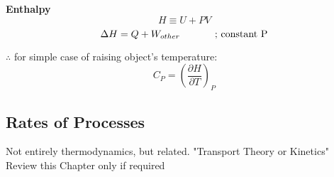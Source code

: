 \begin{shaded}
\textbf{Enthalpy}
\[H \equiv U + PV\]
\begin{equation}
    \Delta H = Q + W_{other} \text{ \hspace{10mm} ; constant P}
\end{equation}
\end{shaded}

$\therefore$ for simple case of raising object's temperature:
\[C_P = \left(\frac{\partial H}{\partial T}\right)_P \]

\subsection{Rates of Processes}
Not entirely thermodynamics, but related. "Transport Theory or Kinetics"\\
Review this Chapter only if required